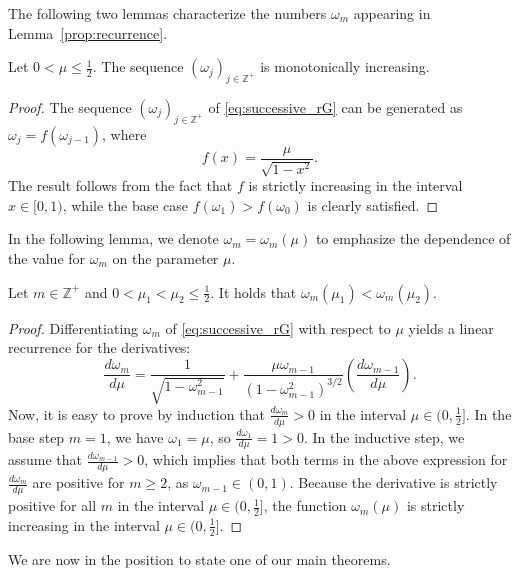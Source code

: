 \documentclass{siamart251216}
\def\Z{\mathbb{Z}}
\begin{document}
{The following two lemmas characterize the numbers $\omega_m$ appearing in Lemma~\ref{prop:recurrence}.

\begin{lemma} \label{lem:monotonic_omega}
 Let $0 < \mu \leq \frac{1}{2}.$ The sequence $(\omega_j)_{j \in \Z^+}$ is monotonically increasing.
\end{lemma}
\begin{proof}
    The sequence $(\omega_j)_{j \in \Z^+}$ of \eqref{eq:successive_rG} can be generated as $\omega_j = f(\omega_{j-1})$, where
    $$f(x) = \frac{\mu}{\sqrt{1-x^2}}.$$
    The result follows from the fact that $f$ is strictly increasing in the interval $x \in [0,1)$, while the base case $f(\omega_1) > f(\omega_0)$ is clearly satisfied.
\end{proof}
In the following lemma, we denote $\omega_m = \omega_m(\mu)$ to emphasize the dependence of the value for $\omega_m$ on the parameter $\mu$.
\begin{lemma} \label{lem:monotonic_in_mu}
    Let $m \in \Z^+$ and $0<\mu_1 < \mu_2 \leq \frac{1}{2}$. It holds that $\omega_m(\mu_1) < \omega_m(\mu_2)$.
\end{lemma}
\begin{proof}
    Differentiating $\omega_m$ of \eqref{eq:successive_rG} with respect to $\mu$ yields a linear recurrence for the derivatives:
    \[\frac{d\omega_m}{d\mu} = \frac{1}{\sqrt{1 - \omega_{m-1}^2}} + \frac{\mu \omega_{m-1}}{(1 - \omega_{m-1}^2)^{3/2}} \left( \frac{d\omega_{m-1}}{d\mu} \right).\]
    Now, it is easy to prove by induction that $\frac{d\omega_m}{d\mu} > 0$ in the interval $\mu \in (0, \frac{1}{2}]$. In the base step $m=1$, we have $\omega_1 = \mu$, so $\frac{d\omega_1}{d\mu} = 1 > 0$. In the inductive step, we assume that $\frac{d\omega_{m-1}}{d\mu} > 0$, which implies that both terms in the above expression for $\frac{d\omega_m}{d\mu}$ are positive for $m\geq2$, as $\omega_{m-1} \in (0,1)$. Because the derivative is strictly positive for all $m$ in the interval $\mu \in (0,\frac{1}{2}]$, the function $\omega_m(\mu)$ is strictly increasing in the interval $\mu \in (0,\frac{1}{2}]$.
\end{proof}

We are now in the position to state one of our main theorems.

}
\end{document}
